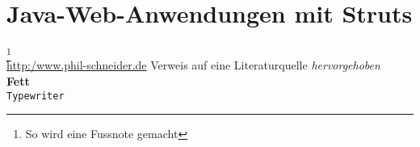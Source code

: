 \section{Java-Web-Anwendungen mit Struts} \label{sec:impl-WebAnwendungen}



\footnote{So wird eine Fussnote gemacht}\\
\url{http:/www.phil-schneider.de}
\citep{Frotscher2004b} Verweis auf eine Literaturquelle
\emph{hervorgehoben}\\
\textbf{Fett}\\
\texttt{Typewriter}\\
















\label{sec:impl-WebAnwendungen-ende}
